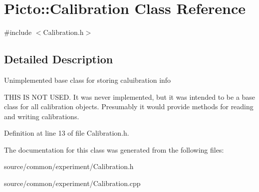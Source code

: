 \hypertarget{class_picto_1_1_calibration}{\section{Picto\-:\-:Calibration Class Reference}
\label{class_picto_1_1_calibration}
}


{\ttfamily \#include $<$Calibration.\-h$>$}



\subsection{Detailed Description}
Unimplemented base class for storing caluibration info

T\-H\-I\-S I\-S N\-O\-T U\-S\-E\-D. It was never implemented, but it was intended to be a base class for all calibration objects. Presumably it would provide methods for reading and writing calibrations. 

Definition at line 13 of file Calibration.\-h.



The documentation for this class was generated from the following files\-:\begin{DoxyCompactItemize}
\item 
source/common/experiment/Calibration.\-h\item 
source/common/experiment/Calibration.\-cpp\end{DoxyCompactItemize}
